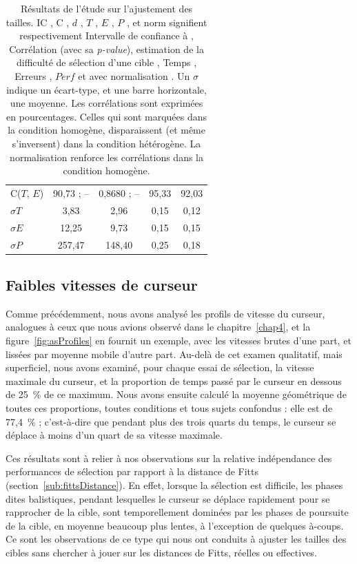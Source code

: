 \begin{table}
\begin{tabular}{l | c c c c}
		C($T$, $E$)		& 90,73 ; --				& 0,8680 ; --				& 95,33						& 92,03						\\
		$\sigma{}T$		& 3,83						& 2,96						& 0,15						& 0,12						\\
		$\sigma{}E$		& 12,25						& 9,73						& 0,15						& 0,15						\\
		$\sigma{}P$		& 257,47					& 148,40					& 0,25						& 0,18						\\
	\end{tabular}
	\caption[Résultats de l'étude sur l'ajustement des tailles]{Résultats de l'étude sur l'ajustement des tailles. \og IC \fg{}, \og C \fg{}, \og $d$ \fg{}, \og $T$ \fg{}, \og $E$ \fg{}, \og $P$ \fg{}, et \og norm \fg{}  signifient respectivement \og Intervalle de confiance à \fg{}, \og Corrélation \fg{} (avec sa \emph{p-value}), \og estimation de la difficulté de sélection d'une cible \fg{}, \og Temps \fg{}, \og Erreurs \fg{}, \og $Perf$ \fg{} et \og avec normalisation \fg{}. Un $\sigma$ indique un écart-type, et une barre horizontale, une moyenne. Les corrélations sont exprimées en pourcentages. Celles qui sont marquées dans la condition homogène, disparaissent (et même s'inversent) dans la condition hétérogène. La normalisation renforce les corrélations dans la condition homogène.}
	\label{tab:synthRes}
\end{table}


	\subsection{Faibles vitesses de curseur}
	Comme précédemment, nous avons analysé les profils de vitesse du curseur, analogues à ceux que nous avions observé dans le chapitre~\ref{chap4}, et la figure~\ref{fig:asProfiles} en fournit un exemple, avec les vitesses brutes d'une part, et lissées par moyenne mobile d'autre part. Au-delà de cet examen qualitatif, mais superficiel, nous avons examiné, pour chaque essai de sélection, la vitesse maximale du curseur, et la proportion de temps passé par le curseur en dessous de 25~\%{} de ce maximum. Nous avons ensuite calculé la moyenne géométrique de toutes ces proportions, toutes conditions et tous sujets confondus : elle est de 77,4~\%{} ; c'est-à-dire que pendant plus des trois quarts du temps, le curseur se déplace à moins d'un quart de sa vitesse maximale.
	
	Ces résultats sont à relier à nos observations sur la relative indépendance des performances de sélection par rapport à la distance de Fitts (section~\ref{sub:fittsDistance}). En effet, lorsque la sélection est difficile, les phases dites balistiques, pendant lesquelles le curseur se déplace rapidement pour se rapprocher de la cible, sont temporellement dominées par les phases de \og poursuite \fg{} de la cible, en moyenne beaucoup plus lentes, à l'exception de quelques à-coups. Ce sont les observations de ce type qui nous ont conduits à ajuster les tailles des cibles sans chercher à jouer sur les distances de Fitts, réelles ou effectives.	
	
